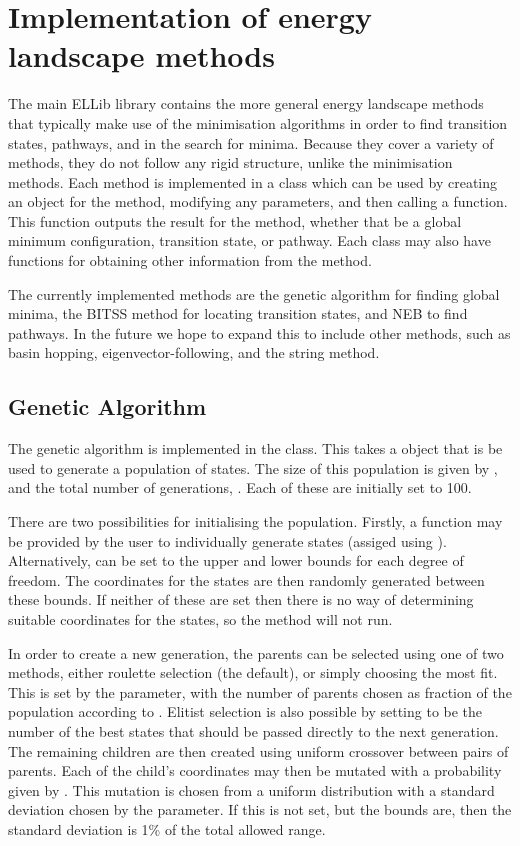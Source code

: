 \section{Implementation of energy landscape methods}
The main ELLib library contains the more general energy landscape methods that typically make use of the minimisation algorithms in order to find transition states, pathways, and in the search for minima.
Because they cover a variety of methods, they do not follow any rigid structure, unlike the minimisation methods.
Each method is implemented in a class which can be used by creating an object for the method, modifying any parameters, and then calling a  function.
This function outputs the result for the method, whether that be a global minimum configuration, transition state, or pathway.
Each class may also have functions for obtaining other information from the method.

The currently implemented methods are the genetic algorithm for finding global minima, the BITSS method for locating transition states, and NEB to find pathways.
In the future we hope to expand this to include other methods, such as basin hopping, eigenvector-following, and the string method.


\subsection{Genetic Algorithm}
The genetic algorithm is implemented in the  class.
This takes a  object that is be used to generate a population of states.
The size of this population is given by , and the total number of generations, .
Each of these are initially set to 100.

There are two possibilities for initialising the population.
Firstly, a function may be provided by the user to individually generate states (assiged using ).
Alternatively,  can be set to the upper and lower bounds for each degree of freedom.
The coordinates for the states are then randomly generated between these bounds.
If neither of these are set then there is no way of determining suitable coordinates for the states, so the method will not run.

In order to create a new generation, the parents can be selected using one of two methods, either roulette selection (the default), or simply choosing the most fit.
This is set by the  parameter, with the number of parents chosen as fraction of the population according to .
Elitist selection is also possible by setting  to be the number of the best states that should be passed directly to the next generation.
The remaining children are then created using uniform crossover between pairs of parents.
Each of the child's coordinates may then be mutated with a probability given by .
This mutation is chosen from a uniform distribution with a standard deviation chosen by the  parameter.
If this is not set, but the bounds are, then the standard deviation is 1\% of the total allowed range.


